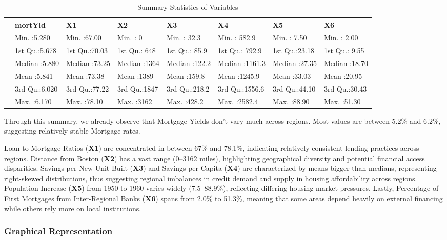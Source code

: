 \documentclass[
  11pt,
]{article}
\begin{document}
\begin{longtable}[t]{llllllll}
\caption{\label{tab:unnamed-chunk-3}Summary Statistics of Variables}\\
\toprule
 & mortYld & X1 & X2 & X3 & X4 & X5 & X6\\
\midrule
 & Min.   :5.280 & Min.   :67.00 & Min.   :   0 & Min.   : 32.3 & Min.   : 582.9 & Min.   : 7.50 & Min.   : 2.00\\
 & 1st Qu.:5.678 & 1st Qu.:70.03 & 1st Qu.: 648 & 1st Qu.: 85.9 & 1st Qu.: 792.9 & 1st Qu.:23.18 & 1st Qu.: 9.55\\
 & Median :5.880 & Median :73.25 & Median :1364 & Median :122.2 & Median :1161.3 & Median :27.35 & Median :18.70\\
 & Mean   :5.841 & Mean   :73.38 & Mean   :1389 & Mean   :159.8 & Mean   :1245.9 & Mean   :33.03 & Mean   :20.95\\
 & 3rd Qu.:6.020 & 3rd Qu.:77.22 & 3rd Qu.:1847 & 3rd Qu.:218.2 & 3rd Qu.:1556.6 & 3rd Qu.:44.10 & 3rd Qu.:30.43\\
\addlinespace
 & Max.   :6.170 & Max.   :78.10 & Max.   :3162 & Max.   :428.2 & Max.   :2582.4 & Max.   :88.90 & Max.   :51.30\\
\bottomrule
\end{longtable}
\endgroup{}

Through this summary, we already observe that Mortgage Yields don't vary
much across regions. Most values are between 5.2\% and 6.2\%, suggesting
relatively stable Mortgage rates.

Loan-to-Mortgage Ratios (\textbf{X1}) are concentrated in between 67\%
and 78.1\%, indicating relatively consistent lending practices across
regions. Distance from Boston (\textbf{X2}) has a vast range (0--3162
miles), highlighting geographical diversity and potential financial
access disparities. Savings per New Unit Built (\textbf{X3}) and Savings
per Capita (\textbf{X4}) are characterized by means bigger than medians,
representing right-skewed distributions, thus suggesting regional
imbalances in credit demand and supply in housing affordability across
regions. Population Increase (\textbf{X5}) from 1950 to 1960 varies
widely (7.5--88.9\%), reflecting differing housing market pressures.
Lastly, Percentage of First Mortgages from Inter-Regional Banks
(\textbf{X6}) spans from 2.0\% to 51.3\%, meaning that some areas depend
heavily on external financing while others rely more on local
institutions.

\subsubsection{Graphical Representation}\label{graphical-representation}
\end{document}
